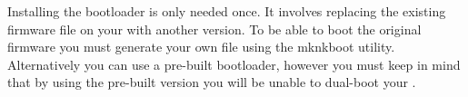 
Installing the bootloader is only needed once. It involves replacing the
existing firmware file on your \dap{} with another version. To be able
to boot the original firmware you must generate your own  file
using the mknkboot utility. Alternatively you can use a pre-built bootloader,
however you must keep in mind that by using the pre-built version you will be
unable to dual-boot your \dap{}.
